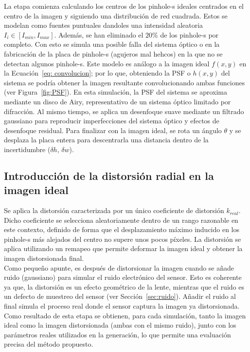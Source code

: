 \documentclass[12pt]{article}
\numberwithin{equation}{section}%
\newcommand{\lightit}[1]{{\lightitfont #1}}
\begin{document}
La etapa comienza calculando los centros de los \lightit{pinhole}-s ideales centrados en el centro de la imagen y siguiendo una distribución de red cuadrada. Estos se modelan como fuentes puntuales dandoles una intensidad aleatoria \(I_i\in[I_{min}, I_{max}]\). Además, se han eliminado el \(20\%\) de los \lightit{pinhole}-s por completo. Con esto se simula una posible falla del sistema óptico o en la fabricación de la placa de \lightit{pinhole}-s (agujeros mal hehcos) en la que no se detectan algunos \lightit{pinhole}-s. Este modelo es análogo a la imagen ideal \(f(x,y)\) en la Ecuación\ \ref{eq: convolucion}; por lo que, obteniendo la PSF o \(h(x,y)\) del sistema se podría obtener la imagen resultante convolucionando ambas funciones (ver Figura\ \ref{fig:PSF}). En esta simulación, la PSF del sistema se aproxima mediante un disco de Airy, representativo de un sistema óptico limitado por difracción. Al mismo tiempo, se aplica un desenfoque suave mediante un filtrado gaussiano para reproducir imperfecciones del sistema óptico y efectos de desenfoque residual. Para finalizar con la imagen ideal, se rota un ángulo \(\theta\) y se desplaza la placa entera para descentrarla una distancia dentro de la incertidumbre ($\delta h$, $\delta w$). \\

\subsection{Introducción de la distorsión radial en la imagen ideal}
Se aplica la distorsión caracterizada por un único coeficiente de distorsión \(k_{real}\). Dicho coeficiente se selecciona aleatoriamente dentro de un rango razonable en este contexto, definido de forma que el desplazamiento máximo inducido en los \lightit{pinhole}-s más alejados del centro no supere unos pocos píxeles. La distorsión se aplica utilizando un remapeo que permite deformar la imagen ideal y obtener la imagen distorsionada final.\\

Como pequeño apunte, es después de distorsionar la imagen cuando se añade ruido (gaussiano) para simular el ruido electrónico del sensor. Esto es coherente ya que, la distorsión es un efecto geométrico de la lente, mientras que el ruido es un defecto de muestreo del sensor (ver Sección\ \ref{sec:ruido}). Añadir el ruido al final simula el proceso real donde el sensor captura la imagen ya distorsionada.\\

Como resultado de esta etapa se obtienen, para cada simulación, tanto la imagen ideal como la imagen distorsionada (ambas con el mismo ruido), junto con los parámetros reales utilizados en la generación, lo que permite una evaluación precisa del método propuesto.\\
\end{document}
